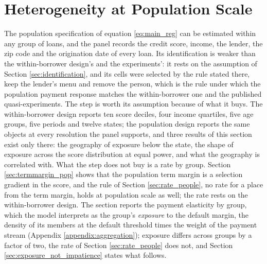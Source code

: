 \section{Heterogeneity at Population Scale}\label{sec:heterogeneity}

The population specification of equation \eqref{eq:main_reg} can be estimated within any group of loans, and the panel records the credit score, income, the lender, the zip code and the origination date of every loan. Its identification is weaker than the within-borrower design's and the experiments': it rests on the assumption of Section \ref{sec:identification}, and its cells were selected by the rule stated there, keep the lender's menu and remove the person, which is the rule under which the population payment response matches the within-borrower one and the published quasi-experiments. The step is worth its assumption because of what it buys. The within-borrower design reports ten score deciles, four income quartiles, five age groups, five periods and twelve states; the population design reports the same objects at every resolution the panel supports, and three results of this section exist only there: the geography of exposure below the state, the shape of exposure across the score distribution at equal power, and what the geography is correlated with. What the step does not buy is a rate by group. Section \ref{sec:termmargin_pop} shows that the population term margin is a selection gradient in the score, and the rule of Section \ref{sec:rate_people}, no rate for a place from the term margin, holds at population scale as well; the rate rests on the within-borrower design. The section reports the payment elasticity by group, which the model interprets as the group's \emph{exposure} to the default margin, the density of its members at the default threshold times the weight of the payment stream (Appendix \ref{appendix:aggregation}); exposure differs across groups by a factor of two, the rate of Section \ref{sec:rate_people} does not, and Section \ref{sec:exposure_not_impatience} states what follows.

